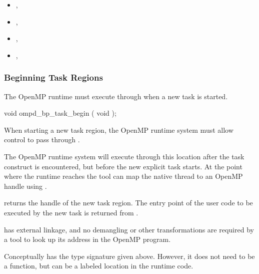 \crossreferences
\begin{itemize}
\item
  , 
\item
  , 
\item
  , 
\item
  , 
\end{itemize}


\subsubsection{Beginning Task Regions}
\label{subsubsec:ompd_bp_task_begin}

The OpenMP runtime must execute through 
when a new task is started.


\begin{cspecific}
\begin{ompSyntax}
void ompd_bp_task_begin ( void );
\end{ompSyntax}
\end{cspecific}


\descr

When starting a new task region, the OpenMP runtime system
must allow control to pass through .

The OpenMP runtime system will execute through this location after the task
construct is encountered, but before the new explicit task starts.
At the point where the runtime reaches 
the tool can map the native thread to an OpenMP handle using
.

 returns the handle of the new task region.
The entry point of the user code to be executed by the new task
is returned from
.

\restrictions

 has external  linkage, and no
demangling or other transformations are required by a tool
to look up its address in the OpenMP program.

Conceptually  has the type signature
given above.
However, it does not need to be a function, but can be a labeled location
in the runtime code.

